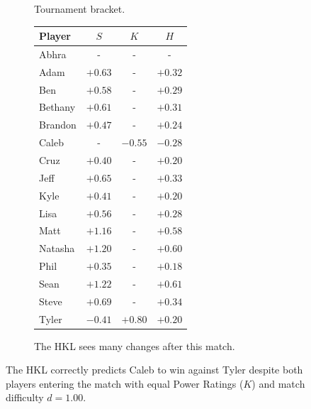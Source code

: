 \documentclass[letterpaper, 10 pt, conference]{ieeeconf}  %
\begin{document}
\begin{figure}
\begin{subfigure}[ht]{0.5\textwidth}
                \caption{Tournament bracket.}
        \end{subfigure}
        \begin{subfigure}[hb]{0.4\textwidth}
                \footnotesize
                \centering
                \begin{tabular}{lccc}
                        Player	&	$S$	&	$K$	&	$H$	\\
                        \midrule							
                        Abhra	&	-	&	-	&	-	\\
                        Adam	&	$+0.63$	&	-	&	$+0.32$	\\
                        Ben	&	$+0.58$	&	-	&	$+0.29$	\\
                        Bethany	&	$+0.61$	&	-	&	$+0.31$	\\
                        Brandon	&	$+0.47$	&	-	&	$+0.24$	\\
                        Caleb	&	-	&	$-0.55$	&	$-0.28$	\\
                        Cruz	&	$+0.40$	&	-	&	$+0.20$	\\
                        Jeff	&	$+0.65$	&	-	&	$+0.33$	\\
                        Kyle	&	$+0.41$	&	-	&	$+0.20$	\\
                        Lisa	&	$+0.56$	&	-	&	$+0.28$	\\
                        Matt	&	$+1.16$	&	-	&	$+0.58$	\\
                        Natasha	&	$+1.20$	&	-	&	$+0.60$	\\
                        Phil	&	$+0.35$	&	-	&	$+0.18$	\\
                        Sean	&	$+1.22$	&	-	&	$+0.61$	\\
                        Steve	&	$+0.69$	&	-	&	$+0.34$	\\
                        Tyler	&	$-0.41$	&	$+0.80$	&	$+0.20$	\\
                \end{tabular}
                \caption{The HKL sees many changes after this match.}
        \end{subfigure}
        \caption{The HKL correctly predicts Caleb to win against Tyler despite
                 both players entering the match with equal Power Ratings ($K$)
                 and match difficulty $d=1.00$.}
\end{figure}

\end{document}
